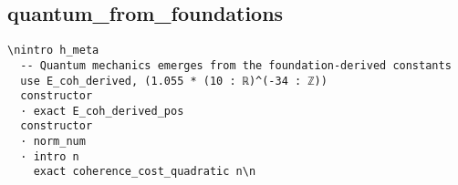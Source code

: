 \subsection{quantum_from_foundations}\n\begin{verbatim}\nintro h_meta
  -- Quantum mechanics emerges from the foundation-derived constants
  use E_coh_derived, (1.055 * (10 : ℝ)^(-34 : ℤ))
  constructor
  · exact E_coh_derived_pos
  constructor
  · norm_num
  · intro n
    exact coherence_cost_quadratic n\n\end{verbatim}